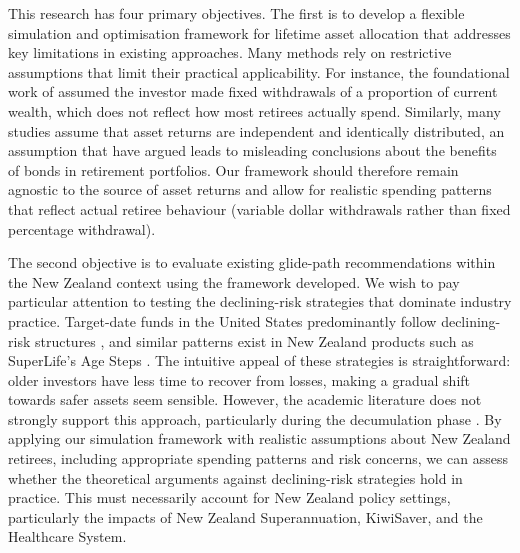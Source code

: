 \documentclass[11pt]{article}
\begin{document}
This research has four primary objectives. The first is to develop a flexible simulation and optimisation framework for lifetime asset allocation that addresses key limitations in existing approaches. Many methods rely on restrictive assumptions that limit their practical applicability. For instance, the foundational work of \textcite{merton1969lifetime} assumed the investor made fixed withdrawals of a proportion of current wealth, which does not reflect how most retirees actually spend. Similarly, many studies assume that asset returns are independent and identically distributed, an assumption that \textcite{anarkulova2025beyond} have argued leads to misleading conclusions about the benefits of bonds in retirement portfolios. Our framework should therefore remain agnostic to the source of asset returns and allow for realistic spending patterns that reflect actual retiree behaviour (variable dollar withdrawals rather than fixed percentage withdrawal).

The second objective is to evaluate existing glide-path recommendations within the New Zealand context using the framework developed. We wish to pay particular attention to testing the declining-risk strategies that dominate industry practice. Target-date funds in the United States predominantly follow declining-risk structures \parencite{dolvin2010asset}, and similar patterns exist in New Zealand products such as SuperLife's Age Steps \parencite{superlife_nodate}. The intuitive appeal of these strategies is straightforward: older investors have less time to recover from losses, making a gradual shift towards safer assets seem sensible. However, the academic literature does not strongly support this approach, particularly during the decumulation phase \parencite[e.g.][]{estrada2014glidepath, estrada2015retirement, anarkulova2025beyond,shiller2005life,merton1969lifetime}. By applying our simulation framework with realistic assumptions about New Zealand retirees, including appropriate spending patterns and risk concerns, we can assess whether the theoretical arguments against declining-risk strategies hold in practice. This must necessarily account for New Zealand policy settings, particularly the impacts of New Zealand Superannuation, KiwiSaver, and the Healthcare System. 
\end{document}
